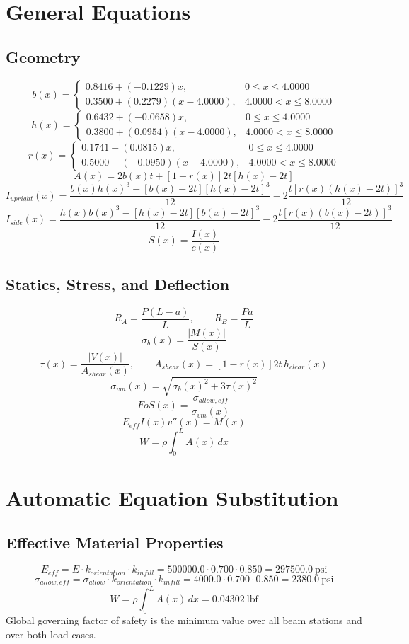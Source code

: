 \documentclass[11pt]{article}
\begin{document}
\section*{General Equations}
\subsection*{Geometry}
\[
b(x)=\begin{cases}0.8416 + (-0.1229)x, & 0 \le x \le 4.0000\\0.3500 + (0.2279)(x-4.0000), & 4.0000 < x \le 8.0000\end{cases}
\]
\[
h(x)=\begin{cases}0.6432 + (-0.0658)x, & 0 \le x \le 4.0000\\0.3800 + (0.0954)(x-4.0000), & 4.0000 < x \le 8.0000\end{cases}
\]
\[
r(x)=\begin{cases}0.1741 + (0.0815)x, & 0 \le x \le 4.0000\\0.5000 + (-0.0950)(x-4.0000), & 4.0000 < x \le 8.0000\end{cases}
\]
\[
A(x)=2b(x)t+[1-r(x)]2t[h(x)-2t]
\]
\[
I_{upright}(x)=\frac{b(x)h(x)^3-[b(x)-2t][h(x)-2t]^3}{12}-2\frac{t[r(x)(h(x)-2t)]^3}{12}
\]
\[
I_{side}(x)=\frac{h(x)b(x)^3-[h(x)-2t][b(x)-2t]^3}{12}-2\frac{t[r(x)(b(x)-2t)]^3}{12}
\]
\[
S(x)=\frac{I(x)}{c(x)}
\]

\subsection*{Statics, Stress, and Deflection}
\[
R_A=\frac{P(L-a)}{L}, \qquad R_B=\frac{Pa}{L}
\]
\[
\sigma_b(x)=\frac{|M(x)|}{S(x)}
\]
\[
\tau(x)=\frac{|V(x)|}{A_{shear}(x)}, \qquad A_{shear}(x)=[1-r(x)]2t\,h_{clear}(x)
\]
\[
\sigma_{vm}(x)=\sqrt{\sigma_b(x)^2+3\tau(x)^2}
\]
\[
FoS(x)=\frac{\sigma_{allow,eff}}{\sigma_{vm}(x)}
\]
\[
E_{eff}I(x)v''(x)=M(x)
\]
\[
W=\rho\int_0^L A(x)\,dx
\]

\section*{Automatic Equation Substitution}
\subsection*{Effective Material Properties}
\[E_{eff} = E \cdot k_{orientation} \cdot k_{infill} = 500000.0 \cdot 0.700 \cdot 0.850 = 297500.0\ \mathrm{psi}\]
\[\sigma_{allow,eff} = \sigma_{allow} \cdot k_{orientation} \cdot k_{infill} = 4000.0 \cdot 0.700 \cdot 0.850 = 2380.0\ \mathrm{psi}\]
\[W = \rho \int_0^L A(x)\,dx = 0.04302\ \mathrm{lbf}\]
Global governing factor of safety is the minimum value over all beam stations and over both load cases.
\end{document}

